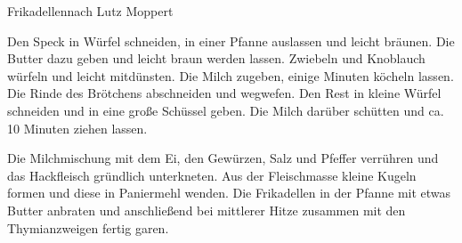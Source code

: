 \begin{recipe}{Frikadellen}{nach Lutz Moppert}
  \label{Frikadellen}
  \inglist

  \steps

Den Speck in Würfel schneiden, in einer Pfanne auslassen und leicht bräunen. Die
Butter dazu geben und leicht braun werden lassen. Zwiebeln und Knoblauch würfeln
und leicht mitdünsten. Die Milch zugeben, einige Minuten köcheln lassen. Die
Rinde des Brötchens abschneiden und wegwefen. Den Rest in kleine Würfel
schneiden und in eine große Schüssel geben. Die Milch darüber schütten und ca.
10 Minuten ziehen lassen.

Die Milchmischung mit dem Ei, den Gewürzen, Salz und Pfeffer verrühren und das
Hackfleisch gründlich unterkneten. Aus der Fleischmasse kleine Kugeln formen und
diese in Paniermehl wenden. Die Frikadellen in der Pfanne mit etwas Butter
anbraten und anschließend bei mittlerer Hitze zusammen mit den Thymianzweigen
fertig garen.

\end{recipe}
